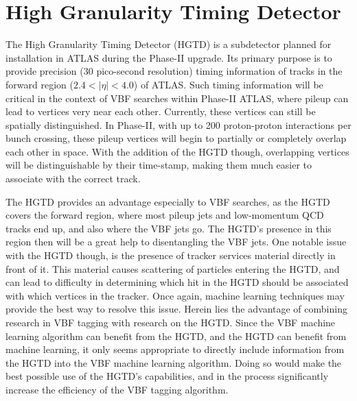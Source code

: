 \documentclass[12pt,letterpaper]{article}
\begin{document}
    
    



\section*{High Granularity Timing Detector}
    The High Granularity Timing Detector (HGTD) is a subdetector planned for installation in ATLAS during the Phase-II upgrade. Its primary purpose is to provide precision (30 pico-second resolution) timing information of tracks in the forward region ($2.4 < |\eta| < 4.0$) of ATLAS. Such timing information will be critical in the context of VBF searches within Phase-II ATLAS, where pileup can lead to vertices very near each other. Currently, these vertices can still be spatially distinguished. In Phase-II, with up to 200 proton-proton interactions per bunch crossing, these pileup vertices will begin to partially or completely overlap each other in space. With the addition of the HGTD though, overlapping vertices will be distinguishable by their time-stamp, making them much easier to associate with the correct track. 

    The HGTD provides an advantage especially to VBF searches, as the HGTD covers the forward region, where most pileup jets and low-momentum QCD tracks end up, and also where the VBF jets go. The HGTD's presence in this region then will be a great help to disentangling the VBF jets. One notable issue with the HGTD though, is the presence of tracker services material directly in front of it. This material causes scattering of particles entering the HGTD, and can lead to difficulty in determining which hit in the HGTD should be associated with which vertices in the tracker. Once again, machine learning techniques may provide the best way to resolve this issue. Herein lies the advantage of combining research in VBF tagging with research on the HGTD. Since the VBF machine learning algorithm can benefit from the HGTD, and the HGTD can benefit from machine learning, it only seems appropriate to directly include information from the HGTD into the VBF machine learning algorithm. Doing so would make the best possible use of the HGTD's capabilities, and in the process significantly increase the efficiency of the VBF tagging algorithm.
\end{document}
